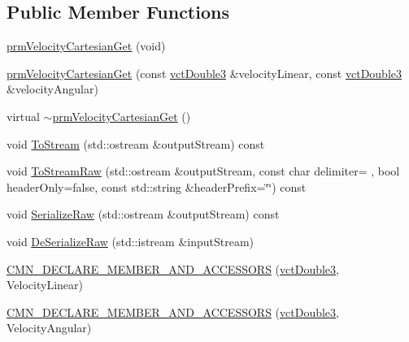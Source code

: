 \subsection*{Public Member Functions}
\begin{DoxyCompactItemize}
\item 
\hyperlink{classprm_velocity_cartesian_get_af45384ae63b5ec9c61b44f5e548f495d}{prm\+Velocity\+Cartesian\+Get} (void)
\item 
\hyperlink{classprm_velocity_cartesian_get_a9e0b16ad9053ce1fc8660982132ed922}{prm\+Velocity\+Cartesian\+Get} (const \hyperlink{vct_fixed_size_vector_types_8h_a4a89122c9d7f72c3f31fe8126e17c3af}{vct\+Double3} \&velocity\+Linear, const \hyperlink{vct_fixed_size_vector_types_8h_a4a89122c9d7f72c3f31fe8126e17c3af}{vct\+Double3} \&velocity\+Angular)
\item 
virtual \hyperlink{classprm_velocity_cartesian_get_aec3fd887c57e37f1c212254ab8f71d30}{$\sim$prm\+Velocity\+Cartesian\+Get} ()
\item 
void \hyperlink{classprm_velocity_cartesian_get_ae778e27fbff2f9f282fe9257365bd242}{To\+Stream} (std\+::ostream \&output\+Stream) const 
\item 
void \hyperlink{classprm_velocity_cartesian_get_a92c966314ca5955b4bf458fa6214fff4}{To\+Stream\+Raw} (std\+::ostream \&output\+Stream, const char delimiter= \textquotesingle{} \textquotesingle{}, bool header\+Only=false, const std\+::string \&header\+Prefix=\char`\"{}\char`\"{}) const 
\item 
void \hyperlink{classprm_velocity_cartesian_get_a824a30ec6ced9a51038613ca5b0205e9}{Serialize\+Raw} (std\+::ostream \&output\+Stream) const 
\item 
void \hyperlink{classprm_velocity_cartesian_get_a680e5b900806f0d8a3b1139d6182fd7d}{De\+Serialize\+Raw} (std\+::istream \&input\+Stream)
\end{DoxyCompactItemize}
{\bf }\par
\begin{DoxyCompactItemize}
\item 
\hyperlink{classprm_velocity_cartesian_get_a6a28bbd169f0ec0fdaa6babb183db3f2}{C\+M\+N\+\_\+\+D\+E\+C\+L\+A\+R\+E\+\_\+\+M\+E\+M\+B\+E\+R\+\_\+\+A\+N\+D\+\_\+\+A\+C\+C\+E\+S\+S\+O\+R\+S} (\hyperlink{vct_fixed_size_vector_types_8h_a4a89122c9d7f72c3f31fe8126e17c3af}{vct\+Double3}, Velocity\+Linear)
\end{DoxyCompactItemize}

{\bf }\par
\begin{DoxyCompactItemize}
\item 
\hyperlink{classprm_velocity_cartesian_get_ad370a42517e1ace185abdfa0fd6c5ab1}{C\+M\+N\+\_\+\+D\+E\+C\+L\+A\+R\+E\+\_\+\+M\+E\+M\+B\+E\+R\+\_\+\+A\+N\+D\+\_\+\+A\+C\+C\+E\+S\+S\+O\+R\+S} (\hyperlink{vct_fixed_size_vector_types_8h_a4a89122c9d7f72c3f31fe8126e17c3af}{vct\+Double3}, Velocity\+Angular)
\end{DoxyCompactItemize}

